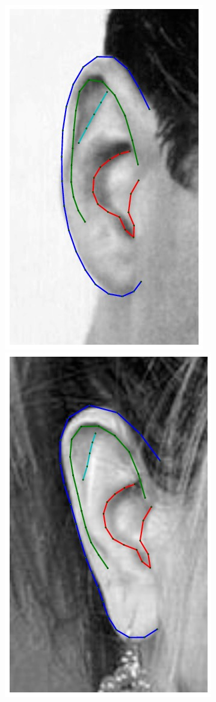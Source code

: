 \begin{figure}
    \hfill
    \includegraphics[height=\flowh]{resources/Ear_Deformable_Model/fittings/final_0006}
    \hfill
    \includegraphics[height=\flowh]{resources/Ear_Deformable_Model/fittings/final_0007}

\end{figure}
